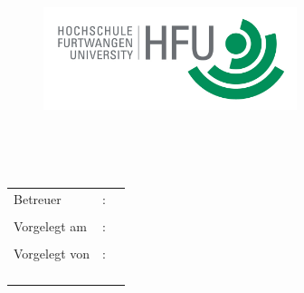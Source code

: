 \begin{titlepage}
\pagestyle{empty}

\begin{flushright}
\begin{figure}[ht]
\flushright
\includegraphics[height=3cm]{content/pictures/hfu.jpg}
\end{figure}
\end{flushright}

\begin{center}
{\fontsize{18}{22} \selectfont \docArtDerArbeit}\\[5mm]
\vspace{1cm}
\begin{onehalfspace}
{\fontsize{22}{26} \selectfont \textbf{\docTitle}}\\[5mm]


\end{onehalfspace}
\end{center}

\vfill
\begin{center}
\begin{tabular}{lcl}
Betreuer  		&:& \docErsterReferent 	\\ \\
Vorgelegt am 	&:& \docAbgabedatum 	\\ \\
Vorgelegt von 	&:& \docA\\
				&&	\docB\\
				&&	\docC\\
				&&	\docD\\
				&&	\docE\\				
\end{tabular}
\end{center}
\end{titlepage}
